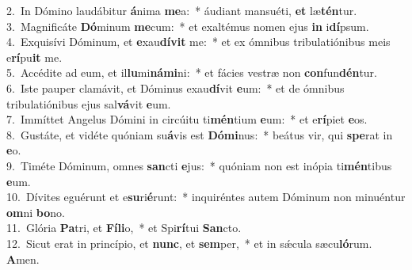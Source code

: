 {2.~}In Dómino laudábitur \textbf{á}nima \textbf{me}a:~* áudiant mansuéti, \textbf{et} læ\textbf{tén}tur.\\
{3.~}Magnificáte \textbf{Dó}minum \textbf{me}cum:~* et exaltémus nomen ejus \textbf{in} i\textbf{dí}psum.\\
{4.~}Exquisívi Dóminum, et \textbf{e}xau\textbf{dí}\textbf{vit} me:~* et ex ómnibus tribulatiónibus meis e\textbf{rí}pu\textbf{it} me.\\
{5.~}Accédite ad eum, et il\textbf{lu}mi\textbf{ná}\textbf{mi}ni:~* et fácies vestræ non \textbf{con}fun\textbf{dén}tur.\\
{6.~}Iste pauper clamávit, et Dóminus exau\textbf{dí}vit \textbf{e}um:~* et de ómnibus tribulatiónibus ejus sal\textbf{vá}vit \textbf{e}um.\\
{7.~}Immíttet Angelus Dómini in circúitu ti\textbf{mén}tium \textbf{e}um:~* et e\textbf{rí}piet \textbf{e}os.\\
{8.~}Gustáte, et vidéte quóniam su\textbf{á}vis est \textbf{Dó}\textbf{mi}nus:~* beátus vir, qui \textbf{spe}rat in \textbf{e}o.\\
{9.~}Timéte Dóminum, omnes \textbf{san}cti \textbf{e}jus:~* quóniam non est inópia ti\textbf{mén}tibus \textbf{e}um.\\
{10.~}Dívites eguérunt et e\textbf{su}ri\textbf{é}runt:~* inquiréntes autem Dóminum non minuéntur \textbf{om}ni \textbf{bo}no.\\
{11.~}Glória \textbf{Pa}tri, et \textbf{Fí}\textbf{li}o,~* et Spi\textbf{rí}tui \textbf{San}cto.\\
{12.~}Sicut erat in princípio, et \textbf{nunc}, et \textbf{sem}per,~* et in sǽcula sæcu\textbf{ló}rum. \textbf{A}men.\\
